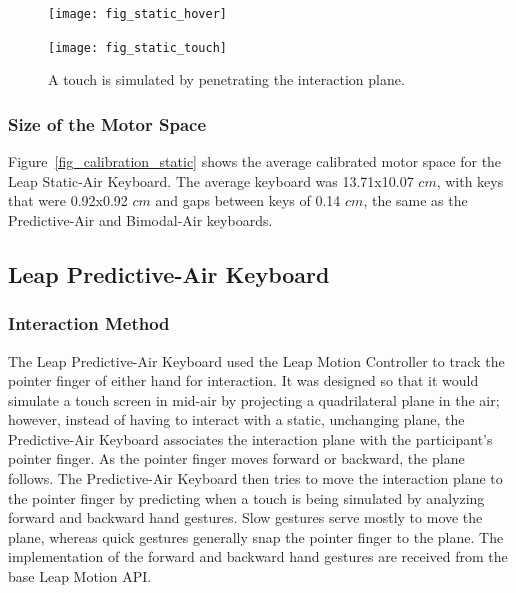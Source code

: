 \begin{figure}[h]
	\centering
	\begin{minipage}[t]{5.8in}
		\begin{minipage}[t]{2.85in}
			\texttt{[image: fig\_static\_hover]}
		\end{minipage}
		\begin{minipage}[t]{2.9in}
			\texttt{[image: fig\_static\_touch]}
		\end{minipage}
	\end{minipage}
	\caption[Leap Static-Air Word Separation]{A touch is simulated by penetrating the interaction plane.}
	\label{static_press_comparison}
\end{figure}

\subsubsection{Size of the Motor Space}
Figure~\ref{fig_calibration_static} shows the average calibrated motor space for the Leap Static-Air Keyboard. The average keyboard was 13.71x10.07 $cm$, with keys that were 0.92x0.92 $cm$ and gaps between keys of 0.14 $cm$, the same as the Predictive-Air and Bimodal-Air keyboards.

\subsection{Leap Predictive-Air Keyboard}
\subsubsection{Interaction Method}
The Leap Predictive-Air Keyboard used the Leap Motion Controller to track the pointer finger of either hand for interaction. It was designed so that it would simulate a touch screen in mid-air by projecting a quadrilateral plane in the air; however, instead of having to interact with a static, unchanging plane, the Predictive-Air Keyboard associates the interaction plane with the participant's pointer finger. As the pointer finger moves forward or backward, the plane follows. The Predictive-Air Keyboard then tries to move the interaction plane to the pointer finger by predicting when a touch is being simulated by analyzing forward and backward hand gestures. Slow gestures serve mostly to move the plane, whereas quick gestures generally snap the pointer finger to the plane. The implementation of the forward and backward hand gestures are received from the base Leap Motion API.

